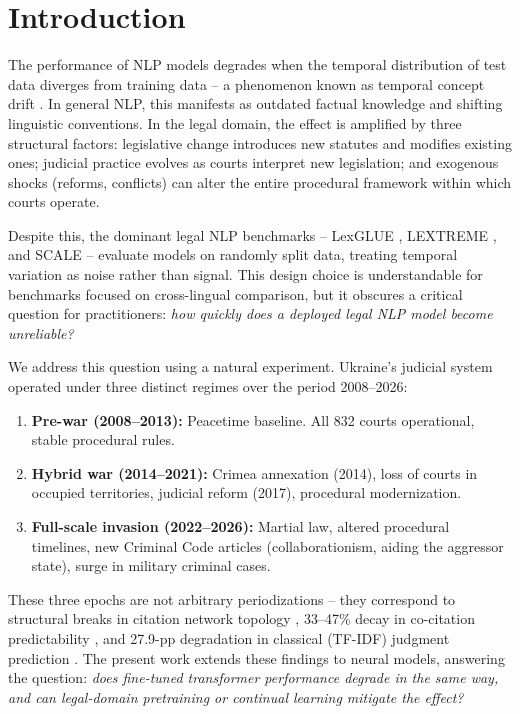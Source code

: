 \documentclass[11pt]{article}
\begin{document}
\section{Introduction}

The performance of NLP models degrades when the temporal distribution of test data diverges from training data -- a phenomenon known as temporal concept drift \citep{lazaridou2021temporal,luu2022temporal}. In general NLP, this manifests as outdated factual knowledge and shifting linguistic conventions. In the legal domain, the effect is amplified by three structural factors: legislative change introduces new statutes and modifies existing ones; judicial practice evolves as courts interpret new legislation; and exogenous shocks (reforms, conflicts) can alter the entire procedural framework within which courts operate.

Despite this, the dominant legal NLP benchmarks -- LexGLUE \citep{chalkidis2021lexglue}, LEXTREME \citep{niklaus2023lextreme}, and SCALE \citep{niklaus2023scale} -- evaluate models on randomly split data, treating temporal variation as noise rather than signal. This design choice is understandable for benchmarks focused on cross-lingual comparison, but it obscures a critical question for practitioners: \emph{how quickly does a deployed legal NLP model become unreliable?}

We address this question using a natural experiment. Ukraine's judicial system operated under three distinct regimes over the period 2008--2026:
\begin{enumerate}[nosep]
  \item \textbf{Pre-war (2008--2013):} Peacetime baseline. All 832 courts operational, stable procedural rules.
  \item \textbf{Hybrid war (2014--2021):} Crimea annexation (2014), loss of courts in occupied territories, judicial reform (2017), procedural modernization.
  \item \textbf{Full-scale invasion (2022--2026):} Martial law, altered procedural timelines, new Criminal Code articles (collaborationism, aiding the aggressor state), surge in military criminal cases.
\end{enumerate}

These three epochs are not arbitrary periodizations -- they correspond to structural breaks in citation network topology \citep{ovcharov2025citation}, 33--47\% decay in co-citation predictability \citep{ovcharov2025statute}, and 27.9-pp degradation in classical (TF-IDF) judgment prediction \citep{ovcharov2025tokenizer}. The present work extends these findings to neural models, answering the question: \emph{does fine-tuned transformer performance degrade in the same way, and can legal-domain pretraining or continual learning mitigate the effect?}
\end{document}
